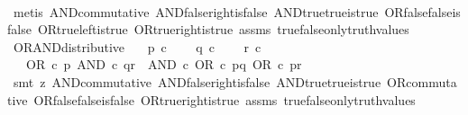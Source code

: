 \begin{isabellebody}
%
\isadelimproof
\ \ %
\endisadelimproof
%
\isatagproof
{}\isamarkupfalse%
\ {\isacharparenleft}{\kern0pt}metis\ AND{\isacharunderscore}{\kern0pt}commutative\ AND{\isacharunderscore}{\kern0pt}false{\isacharunderscore}{\kern0pt}right{\isacharunderscore}{\kern0pt}is{\isacharunderscore}{\kern0pt}false\ AND{\isacharunderscore}{\kern0pt}true{\isacharunderscore}{\kern0pt}true{\isacharunderscore}{\kern0pt}is{\isacharunderscore}{\kern0pt}true\ OR{\isacharunderscore}{\kern0pt}false{\isacharunderscore}{\kern0pt}false{\isacharunderscore}{\kern0pt}is{\isacharunderscore}{\kern0pt}false\ OR{\isacharunderscore}{\kern0pt}true{\isacharunderscore}{\kern0pt}left{\isacharunderscore}{\kern0pt}is{\isacharunderscore}{\kern0pt}true\ OR{\isacharunderscore}{\kern0pt}true{\isacharunderscore}{\kern0pt}right{\isacharunderscore}{\kern0pt}is{\isacharunderscore}{\kern0pt}true\ assms\ true{\isacharunderscore}{\kern0pt}false{\isacharunderscore}{\kern0pt}only{\isacharunderscore}{\kern0pt}truth{\isacharunderscore}{\kern0pt}values{\isacharparenright}{\kern0pt}%
\endisatagproof
{\isafoldproof}%
%
\isadelimproof
\isanewline
%
\endisadelimproof
\isanewline
{}\isamarkupfalse%
\ OR{\isacharunderscore}{\kern0pt}AND{\isacharunderscore}{\kern0pt}distributive{\isacharcolon}{\kern0pt}\isanewline
\ \ \ {\isachardoublequoteopen}p\ {\isasymin}\isactrlsub c\ {\isasymOmega}{\isachardoublequoteclose}\isanewline
\ \ \ {\isachardoublequoteopen}q\ {\isasymin}\isactrlsub c\ {\isasymOmega}{\isachardoublequoteclose}\isanewline
\ \ \ {\isachardoublequoteopen}r\ {\isasymin}\isactrlsub c\ {\isasymOmega}{\isachardoublequoteclose}\isanewline
\ \ \ {\isachardoublequoteopen}OR\ {\isasymcirc}\isactrlsub c\ {\isasymlangle}p{\isacharcomma}{\kern0pt}\ AND\ {\isasymcirc}\isactrlsub c\ {\isasymlangle}q{\isacharcomma}{\kern0pt}r{\isasymrangle}{\isasymrangle}\ {\isacharequal}{\kern0pt}\ AND\ {\isasymcirc}\isactrlsub c\ {\isasymlangle}OR\ {\isasymcirc}\isactrlsub c\ {\isasymlangle}p{\isacharcomma}{\kern0pt}q{\isasymrangle}{\isacharcomma}{\kern0pt}\ OR\ {\isasymcirc}\isactrlsub c\ {\isasymlangle}p{\isacharcomma}{\kern0pt}r{\isasymrangle}{\isasymrangle}{\isachardoublequoteclose}\isanewline
%
\isadelimproof
\ \ %
\endisadelimproof
%
\isatagproof
{}\isamarkupfalse%
\ {\isacharparenleft}{\kern0pt}smt\ {\isacharparenleft}{\kern0pt}z{}{\isacharparenright}{\kern0pt}\ AND{\isacharunderscore}{\kern0pt}commutative\ AND{\isacharunderscore}{\kern0pt}false{\isacharunderscore}{\kern0pt}right{\isacharunderscore}{\kern0pt}is{\isacharunderscore}{\kern0pt}false\ AND{\isacharunderscore}{\kern0pt}true{\isacharunderscore}{\kern0pt}true{\isacharunderscore}{\kern0pt}is{\isacharunderscore}{\kern0pt}true\ OR{\isacharunderscore}{\kern0pt}commutative\ OR{\isacharunderscore}{\kern0pt}false{\isacharunderscore}{\kern0pt}false{\isacharunderscore}{\kern0pt}is{\isacharunderscore}{\kern0pt}false\ OR{\isacharunderscore}{\kern0pt}true{\isacharunderscore}{\kern0pt}right{\isacharunderscore}{\kern0pt}is{\isacharunderscore}{\kern0pt}true\ assms\ true{\isacharunderscore}{\kern0pt}false{\isacharunderscore}{\kern0pt}only{\isacharunderscore}{\kern0pt}truth{\isacharunderscore}{\kern0pt}values{\isacharparenright}{\kern0pt}%

\end{isabellebody}
